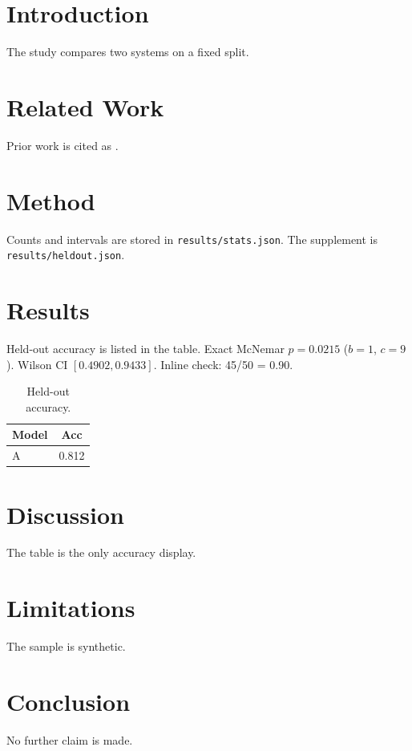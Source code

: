\documentclass{article}
\begin{document}
\begin{abstract}
Synthetic submission used only as a mechanical-check fixture.
\end{abstract}
\section{Introduction}
The study compares two systems on a fixed split.
\section{Related Work}
Prior work is cited as \cite{vaswani2017}.
\section{Method}
Counts and intervals are stored in \texttt{results/stats.json}.
The supplement is \texttt{results/heldout.json}.
\section{Results}
Held-out accuracy is listed in the table.
Exact McNemar $p=0.0215$ ($b=1$, $c=9$).
Wilson CI $[0.4902, 0.9433]$.
Inline check: 45/50 = 0.90.

\begin{table}
\caption{Held-out accuracy.}
\label{tab:acc}
\begin{tabular}{lc}
\toprule
Model & Acc \\
\midrule
A & 0.812 \\
\bottomrule
\end{tabular}
\end{table}
\section{Discussion}
The table is the only accuracy display.
\section{Limitations}
The sample is synthetic.
\section{Conclusion}
No further claim is made.
\end{document}
